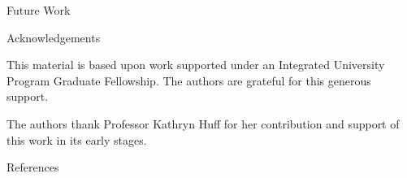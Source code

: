 \documentclass[final]{beamer}
\newlength{\onecolwid}
\newlength{\threecolwid}
\begin{document}
\begin{frame}[t]
\begin{columns}[t,totalwidth=\threecolwid]
\begin{column}{\onecolwid}
\begin{alertblock}{Future Work }
\end{alertblock}

%




\begin{block}{Acknowledgements}

	This material is based upon work supported under an Integrated University Program Graduate Fellowship. The authors are grateful for this generous support.

The authors thank Professor Kathryn Huff for her contribution and support of this work in its early stages.
	
\end{block}



\begin{block}{References}

	{\footnotesize 
	}
\end{block}





\end{column} %

\end{columns} %

\end{frame} %
\end{document}
